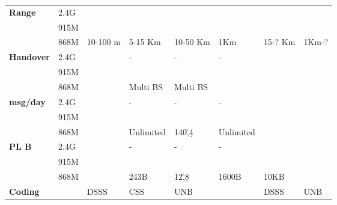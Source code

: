 \begin{longtable}{l|l|l|l|l|l|l|l}
	\bf{Range}                         & 2.4G             &              &                  &               &             &                    &                 \\
	\                                  & 915M             &              &                  &               &             &                    &                 \\
	\                                  & 868M             & 10-100 m     & 5-15 Km          & 10-50	Km      & 1Km         & 15-? Km            & 1Km-?           \\\hline
	\bf{Handover}                      & 2.4G             & \ko          & -                & -             & -           & \ko                & \ko             \\
	\                                  & 915M             & \ko          & \ko              & \ko           & \ko         & \ko                & \ko             \\
	\                                  & 868M             & \ko          & Multi \ac{BS}    & Multi	\ac{BS} & \ko         & \ko                & \ko             \\\hline
	\bf{msg/day}                       & 2.4G             & \ko          & -                & -             & -           & \ko                & \ko             \\
	\                                  & 915M             & \ko          & \ko              & \ko           & \ko         & \ko                & \ko             \\
	\                                  & 868M             & \ko          & Unlimited        & 140\u,4\d     & Unlimited   & \ko                & \ko             \\\hline
	\bf{\ac{PL}	B}                     & 2.4G             & \ko          & -                & -             & -           & \ko                & \ko             \\
	\                                  & 915M             & \ko          & \ko              & \ko           & \ko         & \ko                & \ko             \\
	\                                  & 868M             & \ko          & 243B             & 12\u,8\d      & 1600B       & 10KB               & \ko             \\\hline
	\bf{Coding}                        &                  & \ac{DSSS}    & \ac{CSS}         & \ac{UNB}      & \ko         & \ac{DSSS}          & \ac{UNB}        \\\hline

\end{longtable}
